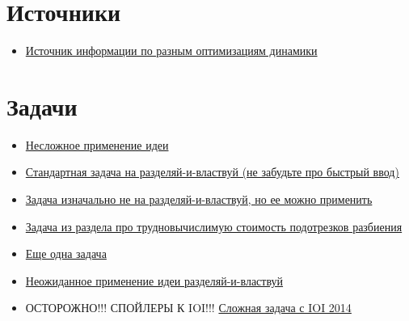 


\section{Источники}

\begin{itemize}
    \item \href{https://codeforces.com/blog/entry/8219}{Источник информации по разным оптимизациям динамики}
\end{itemize}

\section{Задачи}

\begin{itemize}
    \item \href{https://codeforces.com/problemset/problem/673/E}{Несложное применение идеи}
    \item \href{https://codeforces.com/contest/321/problem/E}{Стандартная задача на разделяй-и-властвуй (не забудьте про быстрый ввод)}
    \item \href{https://codeforces.com/contest/1527/problem/E}{Задача изначально не на разделяй-и-властвуй, но ее можно применить}
    \item \href{https://codeforces.com/contest/868/problem/F}{Задача из раздела про трудновычислимую стоимость подотрезков разбиения}
    \item \href{https://www.spoj.com/problems/LARMY/}{Еще одна задача}
    \item \href{https://oj.uz/problem/view/COI15_nafta}{Неожиданное применение идеи разделяй-и-властвуй}
    \item ОСТОРОЖНО!!! СПОЙЛЕРЫ К IOI!!! \href{https://oj.uz/problem/view/IOI14_holiday}{Сложная задача с IOI 2014}
\end{itemize}
